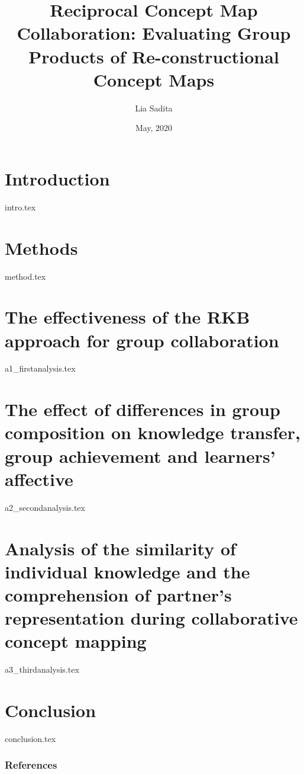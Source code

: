 \documentclass[notes]{beamer}
\title[Reciprocal Concept Map Collaboration]{
Reciprocal Concept Map Collaboration: Evaluating Group Products of Re-constructional Concept Maps
}
\author{Lia Sadita}
\institute{Hiroshima University}
\date{May, 2020}
\begin{document}
\begin{frame}
  \titlepage
\end{frame}



\section{Introduction}
{intro.tex}

\section{Methods}
{method.tex}

\section{The effectiveness of the RKB approach for group collaboration}
{a1_firstanalysis.tex}

\section{The effect of differences in group composition on 
knowledge transfer, group achievement and learners' affective}
{a2_secondanalysis.tex}

\section{Analysis of the similarity of 
individual knowledge and the comprehension of partner's representation during 
collaborative concept mapping}
{a3_thirdanalysis.tex}

\section{Conclusion}
{conclusion.tex}

\begin{frame}[allowframebreaks]
\frametitle{References}

\printbibliography
\end{frame}
\end{document}
